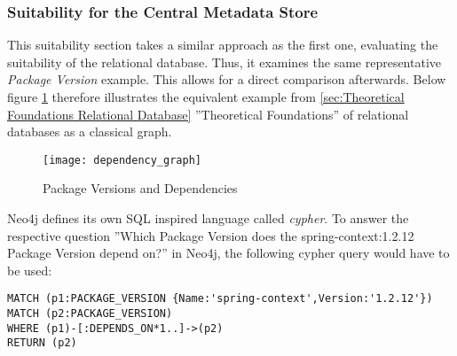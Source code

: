 \subsubsection{Suitability for the Central Metadata Store}
This suitability section takes a similar approach as the first one, evaluating the suitability of the relational database. Thus, it examines the same representative \emph{Package Version} example. This allows for a direct comparison afterwards. Below figure \ref{fig:PackageVersionsAndDependenciesGraph} therefore illustrates the equivalent example from \ref{sec:Theoretical Foundations Relational Database} ''Theoretical Foundations'' of relational databases as a classical graph.

\begin{figure}[H]
	\centering
	\texttt{[image: dependency\_graph]}
	\caption[Package Versions and Dependencies as Graph]{Package Versions and Dependencies }
	\label{fig:PackageVersionsAndDependenciesGraph}
\end{figure}

Neo4j defines its own SQL inspired language called \emph{cypher}. To answer the respective question ''Which Package Version does the spring-context:1.2.12 Package Version depend on?'' in Neo4j, the following cypher query would have to be used:\\

\begin{lstlisting}[caption=Cypher Query -- Package Version Dependencies (transitive), captionpos=b, label=lst:CypherTransitive]
MATCH (p1:PACKAGE_VERSION {Name:'spring-context',Version:'1.2.12'})
MATCH (p2:PACKAGE_VERSION)
WHERE (p1)-[:DEPENDS_ON*1..]->(p2)
RETURN (p2)
\end{lstlisting}

